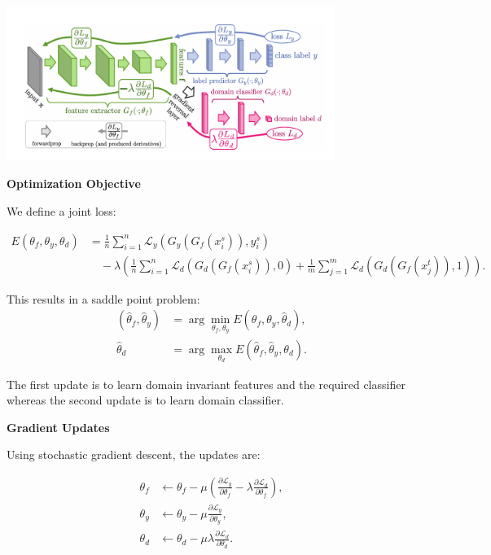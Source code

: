 \documentclass{article}
\begin{document}
\begin{center}
\includegraphics[width=0.8\textwidth]{DANN/DANN_img.png}
\end{center}

\textbf{Optimization Objective}

We define a joint loss:

\begin{align}
E(\theta_f, \theta_y, \theta_d) &= \frac{1}{n} \sum_{i=1}^{n} \mathcal{L}_y(G_y(G_f(x_i^s)), y_i^s) \nonumber \\
&\quad - \lambda \left( \frac{1}{n} \sum_{i=1}^{n} \mathcal{L}_d(G_d(G_f(x_i^s)), 0) + \frac{1}{m} \sum_{j=1}^{m} \mathcal{L}_d(G_d(G_f(x_j^t)), 1) \right).
\label{eq:objective}
\end{align}

This results in a saddle point problem:
\begin{align}
(\hat{\theta}_f, \hat{\theta}_y) &= \arg \min_{\theta_f, \theta_y} E(\theta_f, \theta_y, \hat{\theta}_d), \\
\hat{\theta}_d &= \arg \max_{\theta_d} E(\hat{\theta}_f, \hat{\theta}_y, \theta_d).
\end{align}

The first update is to learn domain invariant features and the required classifier whereas the second update is to learn domain classifier.

\textbf{Gradient Updates}

Using stochastic gradient descent, the updates are:

\begin{align}
\theta_f &\leftarrow \theta_f - \mu \left( \frac{\partial \mathcal{L}_y}{\partial \theta_f} - \lambda \frac{\partial \mathcal{L}_d}{\partial \theta_f} \right), \\
\theta_y &\leftarrow \theta_y - \mu \frac{\partial \mathcal{L}_y}{\partial \theta_y}, \\
\theta_d &\leftarrow \theta_d - \mu \lambda \frac{\partial \mathcal{L}_d}{\partial \theta_d}.
\end{align}
\end{document}
